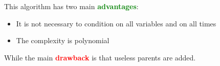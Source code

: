 This algorithm has two main \textbf{\textcolor{Green}{advantages}}:
\begin{itemize}
    \item It is not necessary to condition on all variables and on all times
    \item The complexity is polynomial
\end{itemize}
While the main \textbf{\textcolor{Red}{drawback}} is that useless parents are added.